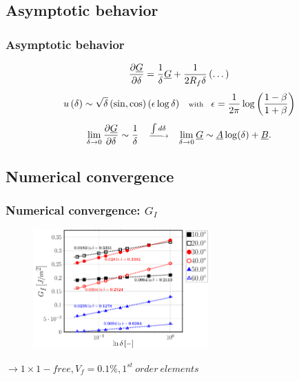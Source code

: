 \documentclass[first,firstsupp,lastsupp,last,hyperref,table]{ETHclass}
\begin{document}
\subsection{Asymptotic behavior}

\begin{frame}
\frametitle{\vspace{0.25cm}\small Asymptotic behavior}
\vspace{-1.25cm}
\centering
\begin{equation*}
\scriptsize
\frac{\partial \underline{G}}{\partial \delta}=\frac{1}{\delta}\underline{G}+\frac{1}{2R_{f}\delta}\left(\dots\right)
\end{equation*}
\begin{equation*}
\scriptsize
u\left(\delta\right)\sim \sqrt{\delta}\left(\sin,\cos\right)\left(\epsilon\log{\delta}\right)\quad\text{with}\quad\epsilon=\frac{1}{2\pi}\log{\left(\frac{1-\beta}{1+\beta}\right)}
\end{equation*}
\begin{equation*}
\scriptsize
\lim_{\delta\rightarrow 0}\frac{\partial \underline{G}}{\partial \delta}\sim\frac{1}{\delta}\quad\xrightarrow{\int d\delta}\quad\lim_{\delta\rightarrow 0}\underline{G}\sim \underline{A}\log(\delta)+\underline{B}.
\end{equation*}
\end{frame}

\subsection{Numerical convergence}

\begin{frame}
\frametitle{\vspace{0.25cm}\small Numerical convergence: $G_{I}$}
\vspace{-.75cm}
\centering
\begin{figure}
\centering
\includegraphics[width=0.6\textwidth]{Vf0_1-free-1st-semilogvsDelta-GI.pdf}
\end{figure}
$\rightarrow 1\times1-free, V_{f}=0.1\%, 1^{st}\ order\ elements$ 
\end{frame}
\end{document}
